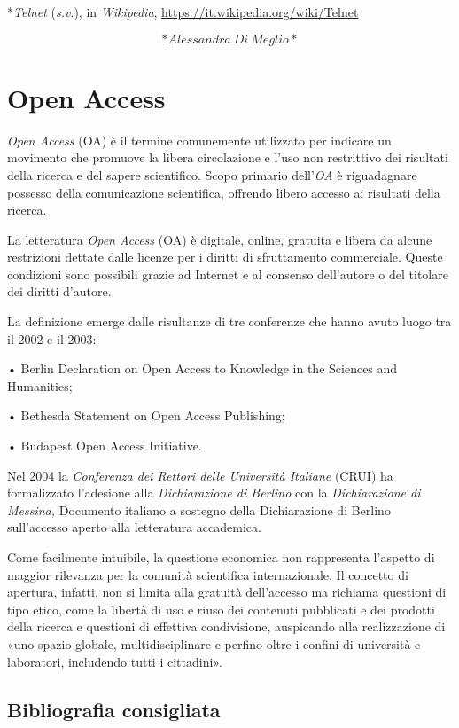 \documentclass[
  b5paper,
  twoside,
  12pt,
  chapterprefix=false,
  bibliography=totocnumbered,
  parskip=false]{scrbook}
\begin{document}
*\emph{Telnet} (\emph{s.v}.), in \emph{Wikipedia},
\url{https://it.wikipedia.org/wiki/Telnet}

\[*Alessandra~Di~Meglio*\]

\hypertarget{open-access}{%
\chapter{Open Access}\label{open-access}}

\emph{Open Access} (OA) è il termine comunemente utilizzato per indicare un
movimento che promuove la libera circolazione e l'uso non restrittivo
dei risultati della ricerca e del sapere scientifico. Scopo primario
dell'\emph{OA} è riguadagnare possesso della comunicazione scientifica,
offrendo libero accesso ai risultati della ricerca.

La letteratura \emph{Open Access} (OA) è digitale, online, gratuita e libera
da alcune restrizioni dettate dalle licenze per i diritti di
sfruttamento commerciale. Queste condizioni sono possibili grazie ad
Internet e al consenso dell'autore o del titolare dei diritti
d'autore.

La definizione emerge dalle risultanze di tre conferenze che hanno avuto
luogo tra il 2002 e il 2003:

• Berlin Declaration on Open Access to Knowledge in the Sciences and
Humanities;

• Bethesda Statement on Open Access Publishing;

• Budapest Open Access Initiative.

Nel 2004 la \emph{Conferenza dei Rettori delle Università Italiane} (CRUI) ha
formalizzato l'adesione alla \emph{Dichiarazione di Berlino} con la
\emph{Dichiarazione di Messina,} Documento italiano a sostegno della
Dichiarazione di Berlino sull'accesso aperto alla letteratura
accademica.

Come facilmente intuibile, la questione economica non rappresenta
l'aspetto di maggior rilevanza per la comunità scientifica
internazionale. Il concetto di apertura, infatti, non si limita alla
gratuità dell'accesso ma richiama questioni di tipo etico, come la
libertà di uso e riuso dei contenuti pubblicati e dei prodotti della
ricerca e questioni di effettiva condivisione, auspicando alla
realizzazione di «uno spazio globale, multidisciplinare e perfino oltre
i confini di università e laboratori, includendo tutti i cittadini».

\hypertarget{bibliografia-consigliata-19}{%
\section*{Bibliografia consigliata}\label{bibliografia-consigliata-19}}
\end{document}
